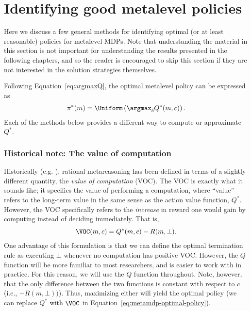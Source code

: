 \section{Identifying good metalevel policies}\label{sec:computing}

Here we discuss a few general methods for identifying optimal (or at least reasonable) policies for metalevel MDPs. Note that understanding the material in this section is not important for understanding the results presented in the following chapters, and so the reader is encouraged to skip this section if they are not interested in the solution strategies themselves.

Following Equation~\ref{eq:argmaxQ}, the optimal metalevel policy can be expressed as
%
\begin{equation}\label{eq:metamdp-optimal-policy}
  \pi^*(m) = \Uniform\left(\argmax_b Q^*(m, c)\right).
\end{equation}
Each of the methods below provides a different way to compute or approximate $Q^*$.

\subsubsection{Historical note: The value of computation}

Historically (e.g. \citealp{russell1991principles}), rational metareasoning has been defined in terms of a slightly different quantity, the \emph{value of computation} (VOC). The VOC is exactly what it sounds like; it specifies the value of performing a computation, where ``value'' refers to the long-term value in the same sense as the action value function, $Q^*$. However, the VOC specifically refers to the \emph{increase} in reward one would gain by computing instead of deciding immediately. That is,
\begin{equation}
  \VOC(m, c) = Q^*(m, c) - R(m, \bot).
\end{equation}
One advantage of this formulation is that we can define the optimal termination rule as executing $\bot$ whenever no computation has positive VOC. However, the $Q$ function will be more familiar to most researchers, and is easier to work with in practice. For this reason, we will use the $Q$ function throughout. Note, however, that the only difference between the two functions is constant with respect to $c$ (i.e., $-R(m, \bot))$). Thus, maximizing either will yield the optimal policy (we can replace $Q^*$ with $\VOC$ in Equation~\ref{eq:metamdp-optimal-policy}).

